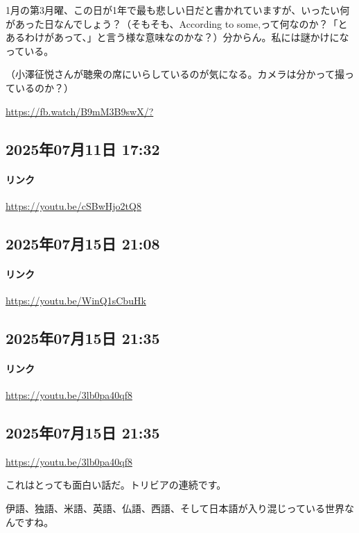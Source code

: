 1月の第3月曜、この日が1年で最も悲しい日だと書かれていますが、いったい何があった日なんでしょう？（そもそも、According to some,って何なのか？「とあるわけがあって、」と言う様な意味なのかな？）分からん。私には謎かけになっている。

（小澤征悦さんが聴衆の席にいらしているのが気になる。カメラは分かって撮っているのか？）

\url{https://fb.watch/B9mM3B9swX/?}

\subsection*{2025年07月11日 17:32}

\paragraph{リンク}
\url{https://youtu.be/cSBwHjo2tQ8}

\subsection*{2025年07月15日 21:08}

\paragraph{リンク}
\url{https://youtu.be/WinQ1sCbuHk}

\subsection*{2025年07月15日 21:35}

\paragraph{リンク}
\url{https://youtu.be/3lb0pa40qf8}

\subsection*{2025年07月15日 21:35}

\url{https://youtu.be/3lb0pa40qf8}

これはとっても面白い話だ。トリビアの連続です。

伊語、独語、米語、英語、仏語、西語、そして日本語が入り混じっている世界なんですね。

